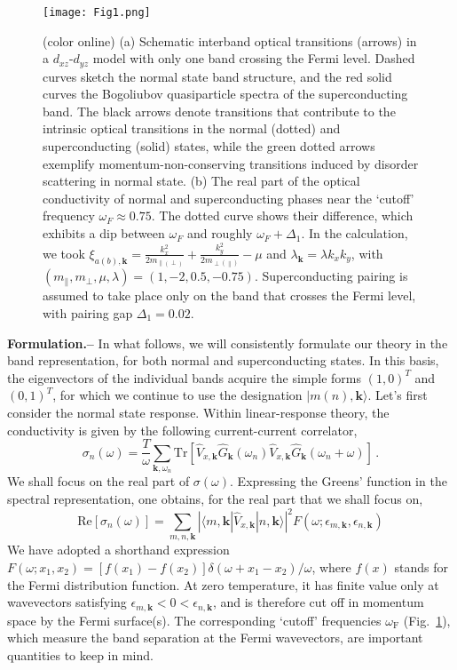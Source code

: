 \documentclass[prl,floatfix,twocolumn,showpacs,amsmath,superscriptaddress]{revtex4-2}
\renewcommand{\vec}[1]{\mathbf{#1}}
\newcommand{\vk}{{\vec{k}}}
\begin{document}
\begin{figure}
	\texttt{[image: Fig1.png]}
	\caption{(color online) (a) Schematic interband optical transitions (arrows) in a $d_{xz}$-$d_{yz}$ model with only one band crossing the Fermi level. Dashed curves sketch the normal state band structure, and the red solid curves the Bogoliubov quasiparticle spectra of the superconducting band. The black arrows denote transitions that contribute to the intrinsic optical transitions in the normal (dotted) and superconducting (solid) states, while the green dotted arrows exemplify momentum-non-conserving transitions induced by disorder scattering in normal state. (b) The real part of the optical conductivity of normal and superconducting phases near the `cutoff' frequency $\omega_F \approx 0.75$. The dotted curve shows their difference, which exhibits a dip between $\omega_F$ and roughly $\omega_F+\Delta_1$. In the calculation, we took $\xi_{a(b),\vk} =\frac{k_x^2}{2m_{\parallel(\perp)}} + \frac{k_y^2}{2m_{\perp(\parallel)}} -\mu $ and $\lambda_\vk= \lambda k_x k_y$, with $(m_\parallel, m_\perp, \mu, \lambda)=(1, -2, 0.5, -0.75)$. Superconducting pairing is assumed to take place only on the band that crosses the Fermi level, with pairing gap $\Delta_1=0.02$. }
	\label{fig01}
\end{figure}

{\bf Formulation.--} In what follows, we will consistently formulate our theory in the band representation, for both normal and superconducting states. In this basis, the eigenvectors of the individual bands acquire the simple forms $(1,0)^T$ and $(0,1)^T$, for which we continue to use the designation $|m(n),\vk\rangle$. Let's first consider the normal state response. Within linear-response theory, the conductivity is given by the following current-current correlator,
\begin{equation}
	\sigma_n(\omega) =\frac{T}{\omega} \sum_{\vk,\omega_n} \text{Tr}\left[ \hat{V}_{x,\vk} \hat{G}_\vk(\omega_n)\hat{V}_{x,\vk} \hat{G}_\vk(\omega_n+\omega) \right] \,.
	\label{eq:SigmaNormal}
\end{equation}
We shall focus on the real part of $\sigma(\omega)$. Expressing the Greens' function in the spectral representation, one obtains, for the real part that we shall focus on, 
\begin{equation}
	\text{Re}[\sigma_n(\omega) ]= \sum_{m,n,\vk} \left|\langle m,\vk| \hat{V}_{x,\vk}  | n,\vk \rangle \right|^2 F(\omega;\epsilon_{m,\vk},\epsilon_{n,\vk})
	\label{eq:ReSigmaN}
\end{equation}
We have adopted a shorthand expression $F(\omega;x_1,x_2)=[f(x_1)-f(x_2)]\delta(\omega + x_1-x_2)/\omega$, where $f(x)$ stands for the Fermi distribution function. At zero temperature, it has finite value only at wavevectors satisfying $\epsilon_{m,\vk}<0<\epsilon_{n,\vk}$, and is therefore cut off in momentum space by the Fermi surface(s). The corresponding `cutoff' frequencies $\omega_\text{F}$ (Fig.~\ref{fig01}), which measure the band separation at the Fermi wavevectors, are important quantities to keep in mind. 
\end{document}
